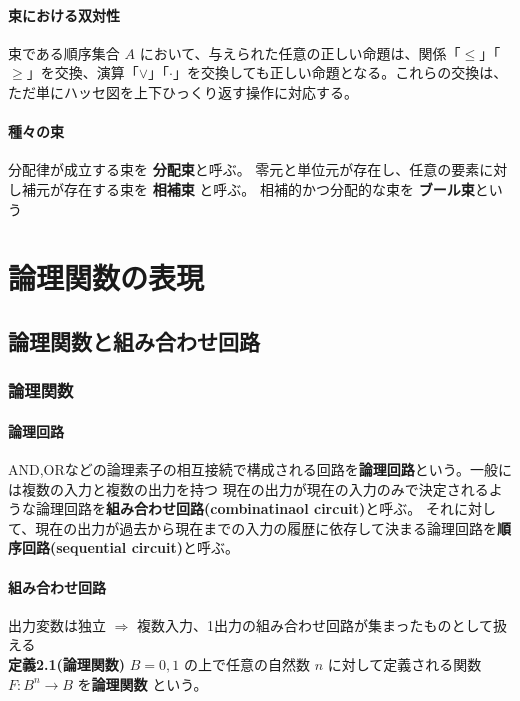 \documentclass[a4j,10pt,oneside,openany,fleqn]{jsbook}
\begin{document}
\subsubsection{束における双対性}
束である順序集合 $A$ において、与えられた任意の正しい命題は、関係「$\leq$」「$\geq$」を交換、演算「$\vee$」「$\cdot$」を交換しても正しい命題となる。これらの交換は、ただ単にハッセ図を上下ひっくり返す操作に対応する。

\subsubsection{種々の束}
分配律が成立する束を \textbf{分配束}と呼ぶ。
零元と単位元が存在し、任意の要素に対し補元が存在する束を \textbf{相補束} と呼ぶ。
相補的かつ分配的な束を \textbf{ブール束}という

\chapter{論理関数の表現}

\section{論理関数と組み合わせ回路}

\subsection{論理関数}

\subsubsection{論理回路}
AND,ORなどの論理素子の相互接続で構成される回路を\textbf{論理回路}という。一般には複数の入力と複数の出力を持つ
現在の出力が現在の入力のみで決定されるような論理回路を\textbf{組み合わせ回路(combinatinaol circuit)}と呼ぶ。
それに対して、現在の出力が過去から現在までの入力の履歴に依存して決まる論理回路を\textbf{順序回路(sequential circuit)}と呼ぶ。

\subsubsection{組み合わせ回路}
出力変数は独立 $\Rightarrow$ 複数入力、1出力の組み合わせ回路が集まったものとして扱える
\\

\textbf{定義2.1(論理関数)}
$B = {0, 1}$ の上で任意の自然数 $n$ に対して定義される関数 $F:B^n \rightarrow B$ を\textbf{論理関数} という。
\end{document}
